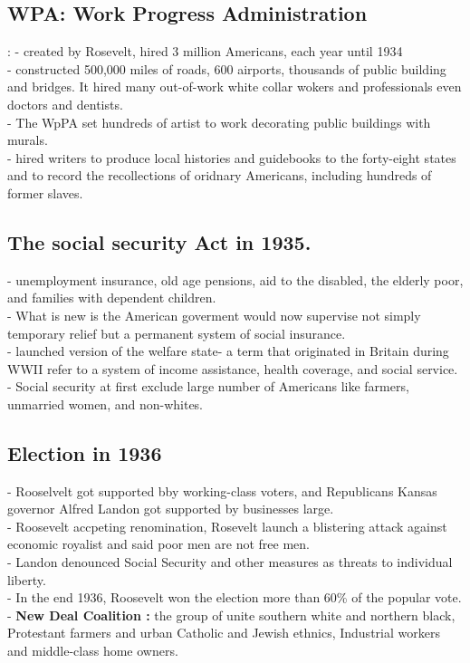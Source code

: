 \documentclass{article}
\begin{document}
\subsection {WPA: Work Progress Administration}:
- created by Rosevelt, hired 3 million Americans, each year until 1934\\
- constructed 500,000 miles of roads, 600 airports, thousands of public building and bridges. It hired many out-of-work white collar wokers and professionals even doctors and dentists.\\
- The WpPA set hundreds of artist to work decorating public buildings with murals. \\
- hired writers to produce local histories and guidebooks to the forty-eight states and to record the recollections of oridnary Americans, including hundreds of former slaves.\\

\subsection{The social security Act in 1935.}
- unemployment insurance, old age pensions, aid to the disabled, the elderly poor, and families with dependent children.\\
- What is new is the American goverment would now supervise not simply temporary relief but a permanent system of social insurance.\\
- launched version of the welfare state- a term that originated in Britain during WWII refer to a system of income assistance, health coverage, and social service.\\
- Social security at first exclude large number of Americans like farmers, unmarried women, and non-whites.\\

\subsection {Election in 1936}
- Rooselvelt got supported bby working-class voters, and Republicans Kansas governor Alfred Landon got supported by businesses large.\\
- Roosevelt accpeting renomination, Rosevelt launch a blistering attack against economic royalist and said poor men are not free men.\\
- Landon denounced Social Security and other measures as threats to individual liberty.\\
- In the end 1936, Roosevelt won the election more than 60\% of the popular vote.\\
- \textbf{ New Deal Coalition :} the group of unite southern white and northern black, Protestant farmers and urban Catholic and Jewish ethnics, Industrial workers and middle-class home owners.\\
\end{document}
